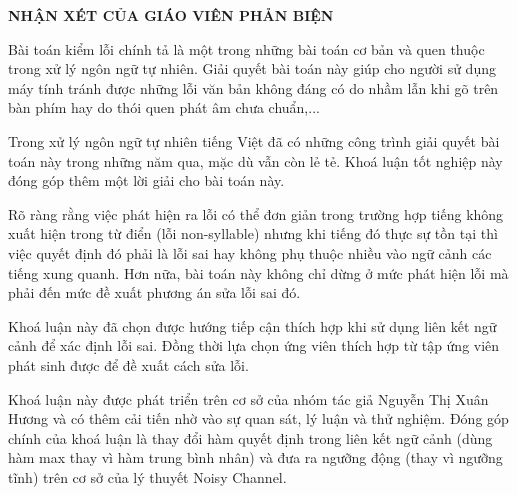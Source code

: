 \begin{titlepage}

\begin{center}
\textbf{NHẬN XÉT CỦA GIÁO VIÊN PHẢN BIỆN}	\\


\end{center}

Bài toán kiểm lỗi chính tả là một trong những bài toán cơ bản và quen thuộc trong xử lý ngôn ngữ tự nhiên.
Giải quyết bài toán này giúp cho người sử dụng máy tính tránh được những lỗi văn bản không đáng có do nhầm lẫn khi gõ trên bàn phím hay do thói quen phát âm chưa chuẩn,...

Trong xử lý ngôn ngữ tự nhiên tiếng Việt đã có những công trình giải quyết bài toán này trong những năm qua, mặc dù vẫn còn lẻ tẻ.
Khoá luận tốt nghiệp này đóng góp thêm một lời giải cho bài toán này.

Rõ ràng rằng việc phát hiện ra lỗi có thể đơn giản trong trường hợp tiếng không xuất hiện trong từ điển (lỗi non-syllable) nhưng khi tiếng đó thực sự tồn tại thì việc quyết định đó phải là lỗi sai hay không phụ thuộc nhiều vào ngữ cảnh các tiếng xung quanh.
Hơn nữa, bài toán này không chỉ dừng ở mức phát hiện lỗi mà phải đến mức đề xuất phương án sửa lỗi sai đó.

Khoá luận này đã chọn được hướng tiếp cận thích hợp khi sử dụng liên kết ngữ cảnh để xác định lỗi sai.
Đồng thời lựa chọn ứng viên thích hợp từ tập ứng viên phát sinh được để đề xuất cách sửa lỗi.

Khoá luận này được phát triển trên cơ sở của nhóm tác giả Nguyễn Thị Xuân Hương và có thêm cải tiến nhờ vào sự quan sát, lý luận và thử nghiệm.
Đóng góp chính của khoá luận là thay đổi hàm quyết định trong liên kết ngữ cảnh (dùng hàm max thay vì hàm trung bình nhân) và đưa ra ngưỡng động (thay vì ngưỡng tĩnh) trên cơ sở của lý thuyết Noisy Channel.

\newpage
{}



\end{titlepage}
